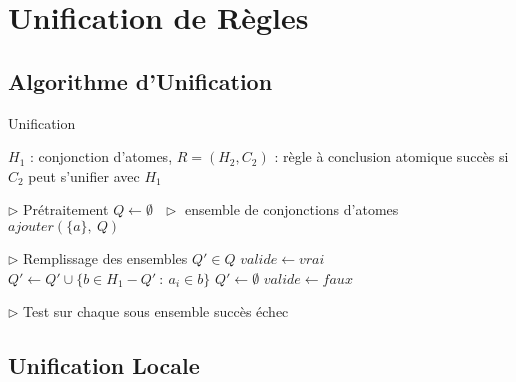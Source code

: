 \section {Unification de R\`egles}

\subsection{Algorithme d'Unification}
\begin{center}
\begin{algorithm}[H]
\caption{Unification}\label{unification}
\begin{algorithmic}[1]
\REQUIRE $H_{1}$ : conjonction d'atomes, $R = (H_{2},C_{2})$ : r\`egle \`a conclusion atomique 
\ENSURE succ\`es si $C_{2}$ peut s'unifier avec $H_{1}$ 

\STATE $\triangleright$ Pr\'etraitement
\STATE $Q \leftarrow \emptyset\ \ \ \triangleright$ ensemble de conjonctions d'atomes
		\STATE $ajouter(\{a\},\ Q)$
	\ENDIF
\ENDFOR

\STATE $\triangleright$ Remplissage des ensembles $Q' \in Q$
	\STATE $valide \leftarrow vrai$
				\STATE $Q' \leftarrow Q' \cup \{b \in H_{1}-Q'\ :\ a_{i} \in b\}$
			\ELSE
				\STATE $Q' \leftarrow \emptyset$
				\STATE $valide \leftarrow faux$
			\ENDIF
		\ENDFOR
	\ENDFOR
\ENDFOR

\STATE $\triangleright$ Test sur chaque sous ensemble
			\RETURN succ\`es
		\ENDIF
	\ENDIF
\ENDFOR
\RETURN \'echec

\end{algorithmic}
\end{algorithm}
\end{center}

\subsection{Unification Locale}

